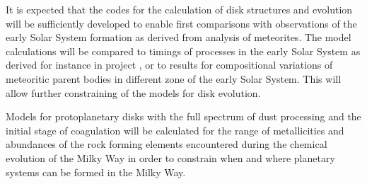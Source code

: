 It is expected that the codes for the calculation of disk
structures and evolution will be sufficiently developed to enable
first comparisons with observations of the early Solar System
formation as derived from analysis of meteorites. The model
calculations will be compared to timings of processes in the early
Solar System as derived for instance in project \projtrie, or to
results for compositional variations of meteoritic parent bodies
in different zone of the early Solar System. This will allow
further constraining of the models for disk evolution.

Models for protoplanetary disks with the full spectrum of dust
processing and the initial stage of coagulation will be calculated
for the range of metallicities and abundances of the rock forming
elements encountered during the chemical evolution of the Milky
Way in order to constrain when and where planetary systems can be
formed in the Milky Way.

